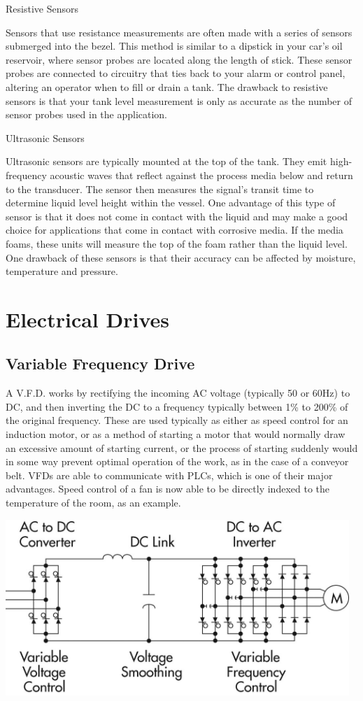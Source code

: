 \documentclass[11pt,a4paper]{article}
\begin{document}
\begin{itemize}
Resistive Sensors

Sensors that use resistance measurements are often made with a series of sensors submerged into the bezel. This method is similar to a dipstick in your car's oil reservoir, where sensor probes are located along the length of stick. These sensor probes are connected to circuitry that ties back to your alarm or control panel, altering an operator when to fill or drain a tank. The drawback to resistive sensors is that your tank level measurement is only as accurate as the number of sensor probes used in the application.

Ultrasonic Sensors

Ultrasonic sensors are typically mounted at the top of the tank. They emit high-frequency acoustic waves that reflect against the process media below and return to the transducer. The sensor then measures the signal’s transit time to determine liquid level height within the vessel.  One advantage of this type of sensor is that it does not come in contact with the liquid and may make a good choice for applications that come in contact with corrosive media. If the media foams, these units will measure the top of the foam rather than the liquid level. One drawback of these sensors is that their accuracy can be affected by moisture, temperature and pressure.\cite{m4}
\end{itemize}


\section{Electrical Drives}
\subsection{Variable Frequency Drive}
A V.F.D. works by rectifying the incoming AC voltage (typically 50 or 60Hz) to DC, and then inverting the DC to a frequency typically between 1\% to 200\% of the original frequency. These are used typically as either as speed control for an induction motor, or as a method of starting a motor that would normally draw an excessive amount of starting current, or the process of starting suddenly would in some way prevent optimal operation of the work, as in the case of a conveyor belt. VFDs are able to communicate with PLCs, which is one of their major advantages. Speed control of a fan is now able to be directly indexed to the temperature of the room, as an example.

\begin{center}
\includegraphics[width=13cm]{vfd.jpg}
\end{center}
\end{document}
